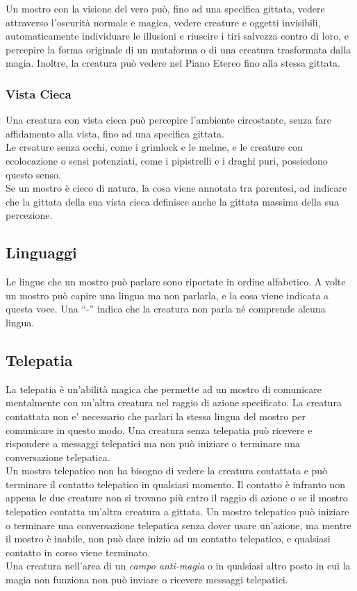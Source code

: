 Un mostro con la visione del vero può, fino ad una specifica gittata, vedere attraverso l'oscurità normale e magica, vedere creature e oggetti invisibili, automaticamente individuare le illusioni e riuscire i tiri salvezza contro di loro, e percepire la forma originale di un mutaforma o di una creatura trasformata dalla magia. Inoltre, la creatura può vedere nel Piano Etereo fino alla stessa gittata.

\subsubsection{Vista Cieca}

Una creatura con vista cieca può percepire l'ambiente circostante, senza fare affidamento alla vista, fino ad una specifica gittata. \\
Le creature senza occhi, come i grimlock e le melme, e le creature con ecolocazione o sensi potenziati, come i pipistrelli e i draghi puri, possiedono questo senso. \\
Se un mostro è cieco di natura, la cosa viene annotata tra parentesi, ad indicare che la gittata della sua vista cieca definisce anche la gittata massima della sua percezione.\\

\subsection{Linguaggi}

Le lingue che un mostro può parlare sono riportate in ordine alfabetico. A volte un mostro può capire una lingua ma non parlarla, e la cosa viene indicata a questa voce. Una ``-'' indica che la creatura non parla né comprende alcuna lingua.

\subsection{Telepatia}

La telepatia è un'abilità magica che permette ad un mostro di comunicare mentalmente con un'altra creatura nel raggio di azione specificato. La creatura contattata non e' necessario che parlari la stessa lingua del mostro per comunicare in questo modo. Una creatura senza telepatia può ricevere e rispondere a messaggi telepatici ma non può iniziare o terminare una conversazione telepatica.\\
Un mostro telepatico non ha bisogno di vedere la creatura contattata e può terminare il contatto telepatico in qualsiasi momento. Il contatto è infranto non appena le due creature non si trovano più entro il raggio di azione o se il mostro telepatico contatta un'altra creatura a gittata. Un mostro telepatico può iniziare o terminare una conversazione  telepatica senza dover usare un'azione, ma mentre il mostro è inabile, non può dare inizio ad un contatto telepatico, e qualsiasi contatto in corso viene terminato.\\
Una creatura nell'area di un \emph{campo anti-magia} o in qualsiasi altro posto in cui la magia non funziona non può inviare o ricevere messaggi telepatici.

